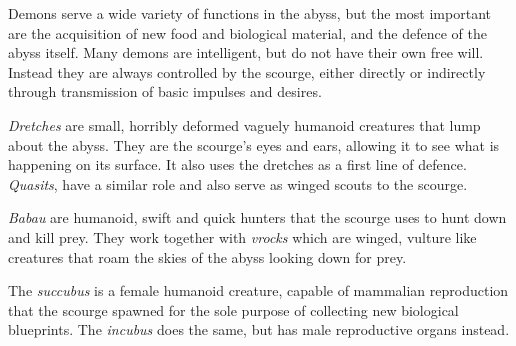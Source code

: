 Demons serve a wide variety of functions in the abyss, but the most important
are the acquisition of new food and biological material, and the defence of
the abyss itself. Many demons are intelligent, but do not have their own
free will. Instead they are always controlled by the scourge, either directly
or indirectly through transmission of basic impulses and desires.

\emph{Dretches} are small, horribly deformed vaguely humanoid creatures that
lump about the abyss. They are the scourge's eyes and ears, allowing it to
see what is happening on its surface. It also uses the dretches as a first
line of defence. \emph{Quasits}, have a similar role and also serve as winged
scouts to the scourge.

\emph{Babau} are humanoid, swift and quick hunters that the scourge uses to
hunt down and kill prey. They work together with \emph{vrocks} which are
winged, vulture like creatures that roam the skies of the abyss looking down
for prey.

The \emph{succubus} is a female humanoid creature, capable of mammalian
reproduction that the scourge spawned for the sole purpose of collecting new
biological blueprints. The \emph{incubus} does the same, but has male
reproductive organs instead.
